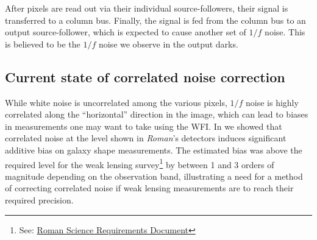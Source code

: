 \documentclass[]{pasj01}
\begin{document}


After pixels are read out via their individual source-followers, their signal is transferred to a column bus. Finally, the signal is fed from the column bus to an output source-follower, which is expected to cause another set of $1/f$ noise. This is believed to be the $1/f$ noise we observe in the output darks.

\subsection{Current state of correlated noise correction}

While white noise is uncorrelated among the various pixels, $1/f$ noise is highly correlated along the ``horizontal'' direction in the image, which can lead to biases in measurements one may want to take using the WFI. In \cite{Laliotis2024} we showed that correlated noise at the level shown in \textit{Roman}'s detectors induces significant additive bias on galaxy shape measurements. The estimated bias was above the required level for the weak lensing survey\footnote{See: \href{https://roman.gsfc.nasa.gov/science/docs/RST-SYS-REQ-0020D_DOORs_Export.pdf}{Roman Science Requirements Document}} by between 1 and 3 orders of magnitude depending on the observation band, illustrating a need for a method of correcting correlated noise if weak lensing measurements are to reach their required precision.
\end{document}
